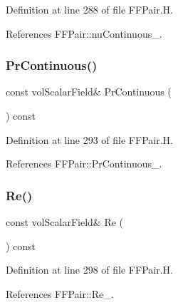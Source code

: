 Definition at line 288 of file F\+F\+Pair.\+H.



References F\+F\+Pair\+::nu\+Continuous\+\_\+.

\mbox{\label{classFoam_1_1FFPair_abc219815dd5cb61f5c56c1f21b18b0ad}} 
\subsubsection{\texorpdfstring{Pr\+Continuous()}{PrContinuous()}}
{\footnotesize\ttfamily const vol\+Scalar\+Field\& Pr\+Continuous (\begin{DoxyParamCaption}{ }\end{DoxyParamCaption}) const\hspace{0.3cm}{\ttfamily [inline]}}



Definition at line 293 of file F\+F\+Pair.\+H.



References F\+F\+Pair\+::\+Pr\+Continuous\+\_\+.

\mbox{\label{classFoam_1_1FFPair_a657f374be896f550786309f405afb0fc}} 
\subsubsection{\texorpdfstring{Re()}{Re()}}
{\footnotesize\ttfamily const vol\+Scalar\+Field\& Re (\begin{DoxyParamCaption}{ }\end{DoxyParamCaption}) const\hspace{0.3cm}{\ttfamily [inline]}}



Definition at line 298 of file F\+F\+Pair.\+H.



References F\+F\+Pair\+::\+Re\+\_\+.

\mbox{\label{classFoam_1_1FFPair_accf8e1581e1247f394e800d7e10a6117}} 
